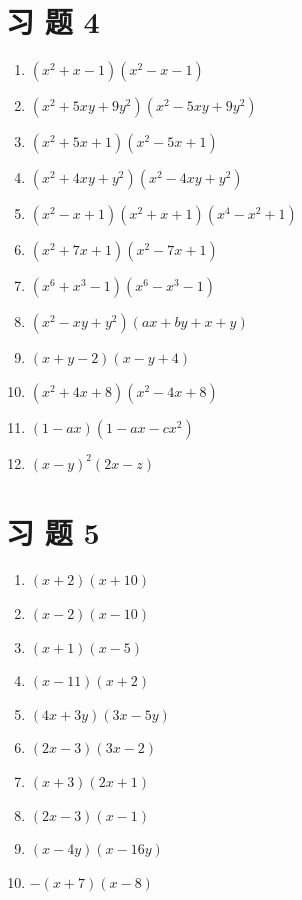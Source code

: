 \documentclass[10pt]{article}
\begin{document}
\section*{习 题 4}
\begin{enumerate}
  \item $\left(x^{2}+x-1\right)\left(x^{2}-x-1\right)$
  \item $\left(x^{2}+5 x y+9 y^{2}\right)\left(x^{2}-5 x y+9 y^{2}\right)$
  \item $\left(x^{2}+5 x+1\right)\left(x^{2}-5 x+1\right)$
  \item $\left(x^{2}+4 x y+y^{2}\right)\left(x^{2}-4 x y+y^{2}\right)$
  \item $\left(x^{2}-x+1\right)\left(x^{2}+x+1\right)\left(x^{4}-x^{2}+1\right)$
  \item $\left(x^{2}+7 x+1\right)\left(x^{2}-7 x+1\right)$
  \item $\left(x^{6}+x^{3}-1\right)\left(x^{6}-x^{3}-1\right)$
  \item $\left(x^{2}-x y+y^{2}\right)(a x+b y+x+y)$
  \item $(x+y-2)(x-y+4)$
  \item $\left(x^{2}+4 x+8\right)\left(x^{2}-4 x+8\right)$
  \item $(1-a x)\left(1-a x-c x^{2}\right)$
  \item $(x-y)^{2}(2 x-z)$
\end{enumerate}

\section*{习 题 5}
\begin{enumerate}
  \item $(x+2)(x+10)$
  \item $(x-2)(x-10)$
  \item $(x+1)(x-5)$
  \item $(x-11)(x+2)$
  \item $(4 x+3 y)(3 x-5 y)$
  \item $(2 x-3)(3 x-2)$
  \item $(x+3)(2 x+1)$
  \item $(2 x-3)(x-1)$
  \item $(x-4 y)(x-16 y)$
  \item $-(x+7)(x-8)$
\end{enumerate}
\end{document}
